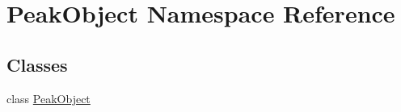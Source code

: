 \hypertarget{namespace_peak_object}{\section{Peak\-Object Namespace Reference}
\label{namespace_peak_object}
}
\subsection*{Classes}
\begin{DoxyCompactItemize}
\item 
class \hyperlink{class_peak_object_1_1_peak_object}{Peak\-Object}
\end{DoxyCompactItemize}
